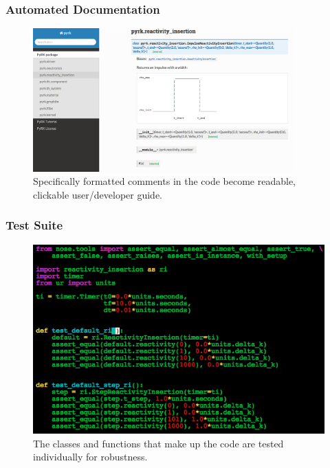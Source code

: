 \begin{frame}[fragile]
  \frametitle{Automated Documentation}
  \begin{figure}[htbp!]
    \begin{center}
      \includegraphics[width=0.9\textwidth]{./progress/doc_ri.png}
    \end{center}
    \caption{Specifically formatted comments in the code become readable,
    clickable user/developer guide.}
    \label{fig:doc_ri}
  \end{figure}
\end{frame}

\begin{frame}[fragile]
  \frametitle{Test Suite}
  \begin{figure}[htbp!]
    \begin{center}
      \includegraphics[height=0.7\textheight]{./progress/tests_pyrk.png}
    \end{center}
    \caption{The classes and functions that make up the code are tested individually for
   robustness.} 
    \label{fig:tests_pyrk}
  \end{figure}
\end{frame}

